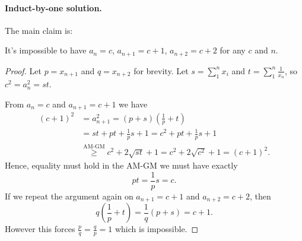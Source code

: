\documentclass[11pt]{scrartcl}
\begin{document}
\paragraph{Induct-by-one solution.}
The main claim is:
\begin{claim*}
  It's impossible to have
  $a_n = c$, $a_{n+1} = c+1$, $a_{n+2} = c+2$ for any $c$ and $n$.
\end{claim*}
\begin{proof}
  Let $p = x_{n+1}$ and $q = x_{n+2}$ for brevity.
  Let $s = \sum_1^n x_i$ and $t = \sum_1^n \frac{1}{x_n}$, so $c^2 = a_n^2 = st$.

  From $a_n = c$ and $a_{n+1} = c+1$ we have
  \begin{align*}
    (c+1)^2 &= a_{n+1}^2 = (p+s)\left( \frac 1p+t \right) \\
    &= st + pt + \frac1ps + 1 = c^2 + pt + \frac1ps + 1 \\
    &\overset{\text{AM-GM}}{\geq} c^2 + 2\sqrt{st} + 1 = c^2 + 2\sqrt{c^2} + 1 = (c+1)^2.
  \end{align*}
  Hence, equality must hold in the AM-GM we must have exactly
  \[ p t = \frac 1p s = c. \]
  If we repeat the argument again on $a_{n+1}=c+1$ and $a_{n+2}=c+2$, then
  \[ q \left( \frac 1p + t \right) = \frac 1q \left( p + s \right) = c + 1. \]
  However this forces $\frac pq = \frac qp = 1$ which is impossible.
\end{proof}
\pagebreak
\end{document}
